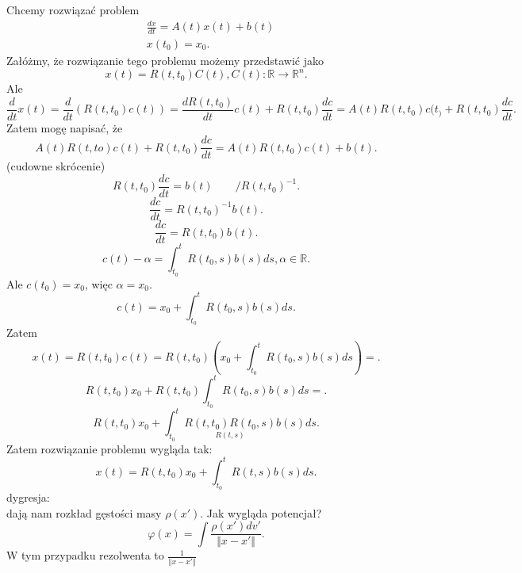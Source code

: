 \documentclass[../main.tex]{subfiles}
\begin{document}
    Chcemy rozwiązać problem
    \begin{align*}
        &\frac{dx}{dt}=A(t)x(t)+b(t)\\
        &x(t_0)=x_0
    .\end{align*}
    Załóżmy, że rozwiązanie tego problemu możemy przedstawić jako
    \[
        x(t) = R(t,t_0)C(t), C(t):\mathbb{R}\to\mathbb{R}^n
    .\]
    Ale
    \[
        \frac{d}{dt}x(t) = \frac{d}{dt} \left( R(t,t_0)c(t) \right) = \frac{dR(t,t_0)}{dt}c(t)+R(t,t_0)\frac{dc}{dt} = A(t)R(t,t_0)c(t_)+R(t,t_0)\frac{dc}{dt}
    .\]
    Zatem mogę napisać, że
    \[
        A(t)R(t,to)c(t)+R(t,t_0)\frac{dc}{dt}=A(t)R(t,t_0)c(t)+b(t)
    .\](cudowne skrócenie)
    \[
        R(t,t_0)\frac{dc}{dt}=b(t) \quad\quad/R(t,t_0)^{-1}
    .\]
    \[
        \frac{dc}{dt}=R(t,t_0)^{-1}b(t)
    .\]
    \[
        \frac{dc}{dt} = R(t,t_0)b(t)
    .\]
    \[
        c(t) -\alpha = \int_{t_0}^t R(t_0,s)b(s) ds, \alpha\in\mathbb{R}
    .\]
    Ale $c(t_0)=x_0$, więc $\alpha = x_0$.
    \[
        c(t) = x_0+\int_{t_0}^t R(t_0,s)b(s)ds
    .\]
    Zatem
    \[
        x(t) = R(t,t_0)c(t) = R(t,t_0)\left( x_0+\int_{t_0}^t R(t_0,s)b(s)ds \right)  =
    .\]
    \[
        R(t,t_0)x_0+R(t,t_0)\int_{t_0}^t R(t_0,s)b(s)ds =
    .\]
    \[
        R(t,t_0)x_0+\int_{t_0}^t \underset{R(t,s)}{R(t,t_0)R(t_0,s)}b(s)ds
    .\]
    Zatem rozwiązanie problemu wygląda tak:
    \[
        x(t) = R(t,t_0)x_0+\int_{t_0}^t R(t,s)b(s)ds
    .\]
    dygresja:\\
    dają nam rozkład gęstości masy $\rho(x')$. Jak wygląda potencjał?
     \[
         \varphi(x) = \int \frac{\rho(x') dv'}{\Vert x-x' \Vert }
    .\]
    W tym przypadku rezolwenta to $\frac{1}{\Vert x-x' \Vert }$\\
\end{document}

